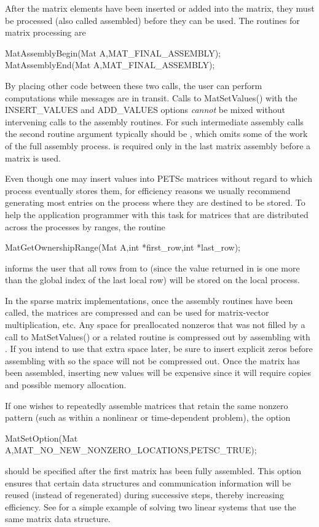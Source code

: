 After the matrix elements have been inserted or added into the matrix,
they must be processed (also called assembled) before they can be used. The routines for matrix
processing are
\begin{tabbing}
  MatAssemblyBegin(Mat A,MAT\_FINAL\_ASSEMBLY);\\
  MatAssemblyEnd(Mat A,MAT\_FINAL\_ASSEMBLY);
\end{tabbing}
By placing other code between these two calls, the user can perform
computations while messages are in transit.
Calls to MatSetValues() with the INSERT\_VALUES and
ADD\_VALUES options {\em cannot} be mixed without intervening calls to
the assembly routines.  For such intermediate assembly calls the
second routine argument  typically should be ,
 which omits some of the work of the full
assembly process.    is
required only in the last matrix assembly before a matrix is used.

Even though one may insert values into PETSc matrices without regard
to which process eventually stores them, for efficiency
reasons we usually recommend generating most entries on the
process where they are destined to be stored.  To help the
application programmer with this task for matrices that are
distributed across the processes by ranges, the routine
\begin{tabbing}
  MatGetOwnershipRange(Mat A,int *first\_row,int *last\_row);
\end{tabbing}
informs the user that all rows from  to
 (since the value returned in  is one more
than the global index of the last local row) will be stored on the local process.

In the sparse matrix implementations, once the assembly routines have been called, the matrices are compressed and can be used for matrix-vector multiplication, etc.
Any space for preallocated nonzeros that was not filled by a call to MatSetValues() or a related routine is compressed out by assembling with .
If you intend to use that extra space later, be sure to insert explicit zeros before assembling with  so the space will not be compressed out.
Once the matrix has been assembled, inserting new values will be expensive since it will require copies and possible memory allocation.

If one wishes to repeatedly assemble matrices that retain the same
nonzero pattern (such as within a nonlinear or time-dependent
problem), the option
\begin{tabbing}
  MatSetOption(Mat A,MAT\_NO\_NEW\_NONZERO\_LOCATIONS,PETSC\_TRUE);
\end{tabbing}
should be specified after the first matrix has been fully assembled.
This option ensures that certain data structures and communication
information will be reused (instead of regenerated) during successive
steps, thereby increasing efficiency.
See  for a simple example of
solving two linear systems that use the same matrix data structure.

